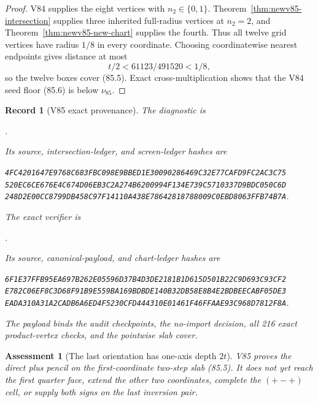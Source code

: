 \documentclass[11pt,oneside]{article}
\newtheorem{assessment}[theorem]{Assessment}
\newtheorem{record}[theorem]{Record}
\theoremstyle{definition}
\theoremstyle{remark}
\begin{document}
\begin{proof}
V84 supplies the eight vertices with \(n_2\in\{0,1\}\).
Theorem~\ref{thm:newv85-intersection} supplies three inherited
full-radius vertices at \(n_2=2\), and
Theorem~\ref{thm:newv85-new-chart} supplies the fourth.  Thus all
twelve grid vertices have radius \(1/8\) in every coordinate.
Choosing coordinatewise nearest endpoints gives distance at most
\[
 t/2<61123/491520<1/8,                               \tag{85.7}
\]
so the twelve boxes cover (85.5).  Exact cross-multiplication shows
that the V84 seed floor (85.6) is below \(\nu_{85}\).
\end{proof}

\begin{record}[V85 exact provenance]
\label{rec:newv85-provenance}
The diagnostic is
\begin{center}\footnotesize
{}.
\end{center}
Its source, intersection-ledger, and screen-ledger hashes are
\begin{center}\scriptsize
\texttt{4FC4201647E9768C683FBC098E9BBED1E30090286469C32E77CAFD9FC2AC3C75}\\
\texttt{520EC6CE676E4C674D06EB3C2A274B6200994F134E739C5710337D9BDC050C6D}\\
\texttt{248D2E00CC8799DB458C97F14110A438E78642818788009C0EBD8063FFB74B7A}.
\end{center}
The exact verifier is
\begin{center}\footnotesize
{}.
\end{center}
Its source, canonical-payload, and chart-ledger hashes are
\begin{center}\scriptsize
\texttt{6F1E37FFB95EA697B262E05596D37B4D3DE2181B1D615D501B22C9D693C93CF2}\\
\texttt{E782C06EF8C3D68F91B9E559BA169BDBDE140B32DB58E8B4E2BDBEECABF05DE3}\\
\texttt{EADA310A31A2CADB6A6ED4F5230CFD444310E01461F46FFAAE93C968D7812F8A}.
\end{center}
The payload binds the audit checkpoints, the no-import decision, all
216 exact product-vertex checks, and the pointwise slab cover.
\end{record}

\begin{assessment}[The last orientation has one-axis depth \(2t\)]
\label{ass:newv85}
V85 proves the direct plus pencil on the first-coordinate two-step
slab (85.5).  It does not yet reach the first quarter face, extend
the other two coordinates, complete the \((+-+)\) cell, or supply
both signs on the last inversion pair.
\end{assessment}
\end{document}
